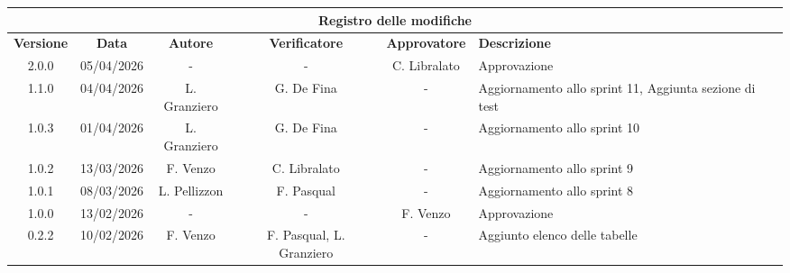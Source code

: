 \documentclass[10pt, letterpaper]{article}
\begin{document}
\begin{center}
    \begin{tabularx}{\textwidth}{|c|c|c|c|c|X|}
        \hline
        \multicolumn{6}{|c|}{\textbf{Registro delle modifiche}}                                                                                                                                                                    \\
        \hline
        \rowcolor{lightgray} \textbf{Versione} & \textbf{Data} & \textbf{Autore} & \textbf{Verificatore}    & \textbf{Approvatore} & \textbf{Descrizione}                                                                          \\
        \hline 
        2.0.0                           & 05/04/2026    & -    & -               & C. Libralato                    & Approvazione                                                               \\
        \hline 
        1.1.0                           & 04/04/2026    & L. Granziero    & G. De Fina               & -                    & Aggiornamento allo sprint 11, Aggiunta sezione di test                                                                  \\
        \hline 
        1.0.3                           & 01/04/2026    & L. Granziero    & G. De Fina               & -                    & Aggiornamento allo sprint 10                                                                  \\
        \hline
        1.0.2                                  & 13/03/2026    & F. Venzo        & C. Libralato             & -                    & Aggiornamento allo sprint 9                                                                   \\
        \hline
        1.0.1                                  & 08/03/2026     & L. Pellizzon    & F. Pasqual               & -                    & Aggiornamento allo sprint 8                                                                   \\
        \hline
        1.0.0                                  & 13/02/2026    & -               & -                        & F. Venzo             & Approvazione                                                                                  \\
        \hline
        0.2.2                                  & 10/02/2026    & F. Venzo        & F. Pasqual, L. Granziero & -                    & Aggiunto elenco delle tabelle                                                                 \\

\end{tabularx}
\end{center}
\end{document}
